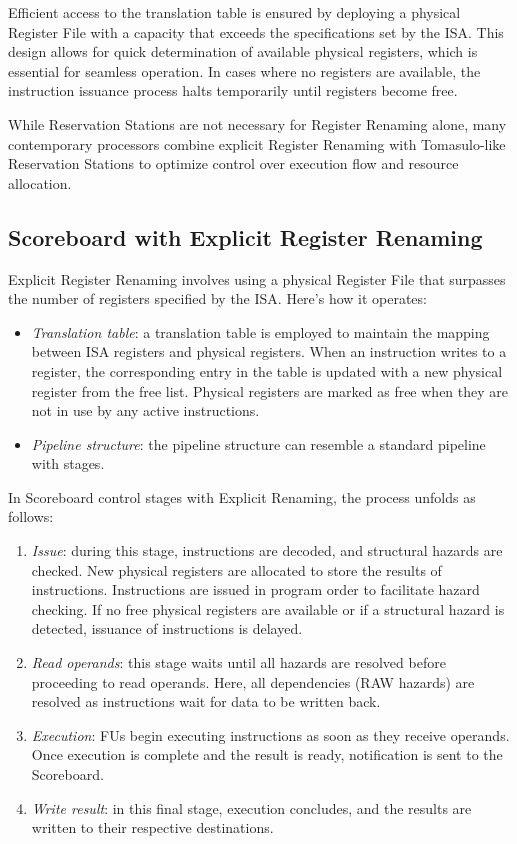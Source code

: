 Efficient access to the translation table is ensured by deploying a physical Register File with a capacity that exceeds the specifications set by the ISA. 
This design allows for quick determination of available physical registers, which is essential for seamless operation. 
In cases where no registers are available, the instruction issuance process halts temporarily until registers become free.

While Reservation Stations are not necessary for Register Renaming alone, many contemporary processors combine explicit Register Renaming with Tomasulo-like Reservation Stations to optimize control over execution flow and resource allocation.

\subsection{Scoreboard with Explicit Register Renaming}
Explicit Register Renaming involves using a physical Register File that surpasses the number of registers specified by the ISA. 
Here's how it operates:
\begin{itemize}
    \item \textit{Translation table}: a translation table is employed to maintain the mapping between ISA registers and physical registers. 
        When an instruction writes to a register, the corresponding entry in the table is updated with a new physical register from the free list. 
        Physical registers are marked as free when they are not in use by any active instructions.
    \item \textit{Pipeline structure}: the pipeline structure can resemble a standard pipeline with stages.
\end{itemize}
In Scoreboard control stages with Explicit Renaming, the process unfolds as follows:
\begin{enumerate}
    \item \textit{Issue}: during this stage, instructions are decoded, and structural hazards are checked. 
        New physical registers are allocated to store the results of instructions. 
        Instructions are issued in program order to facilitate hazard checking. 
        If no free physical registers are available or if a structural hazard is detected, issuance of instructions is delayed.
    \item \textit{Read operands}: this stage waits until all hazards are resolved before proceeding to read operands. 
        Here, all dependencies (RAW hazards) are resolved as instructions wait for data to be written back.
    \item \textit{Execution}: FUs begin executing instructions as soon as they receive operands. 
        Once execution is complete and the result is ready, notification is sent to the Scoreboard.
    \item \textit{Write result}: in this final stage, execution concludes, and the results are written to their respective destinations.
\end{enumerate}
